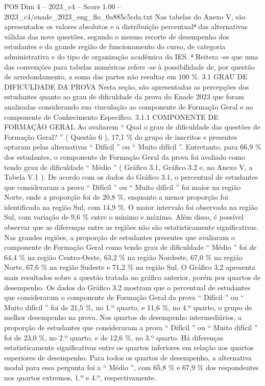 \begin{textsample}{POS Dim 4 – 2023\_c4 – Score 1.00 – 2023\_c4/enade\_2023\_eng\_flo\_0a885c5cda.txt}
Nas tabelas do Anexo V, são apresentados os valores absolutos e a distribuição percentual⁴ das alternativas válidas das nove questões, segundo o mesmo recorte de desempenho dos estudantes e da grande região de funcionamento do curso, de categoria administrativa e do tipo de organização acadêmica da IES. ⁴ Reitera -se que uma das convenções para tabelas numéricas refere -se à possibilidade de, por questão de arredondamento, a soma das partes não resultar em 100 \%. 3.1 GRAU DE DIFICULDADE DA PROVA Nesta seção, são apresentadas as percepções dos estudantes quanto ao grau de dificuldade da prova do Enade 2023 que foram analisadas considerando sua vinculação ao componente de Formação Geral e ao componente de Conhecimento Específico. 3.1.1 COMPONENTE DE FORMAÇÃO GERAL Ao avaliarem “ Qual o grau de dificuldade das questões de Formação Geral? ” ( Questão 6 ), 17,1 \% do grupo de inscritos e presentes optaram pelas alternativas “ Difícil ” ou “ Muito difícil ”.
Entretanto, para 66,9 \% dos estudantes, o componente de Formação Geral da prova foi avaliado como tendo grau de dificuldade “ Médio ” ( Gráfico 3.1, Gráfico 3.2 e, no Anexo V, a Tabela V.1 ).
De acordo com os dados do Gráfico 3.1, o percentual de estudantes que consideraram a prova “ Difícil ” ou “ Muito difícil ” foi maior na região Norte, onde a proporção foi de 20,8 \%, enquanto a menor proporção foi identificada na região Sul, com 14,9 \%.
O maior intervalo foi observado na região Sul, com variação de 9,6 \% entre o mínimo e máximo.
Além disso, é possível observar que as diferenças entre as regiões não são estatisticamente significativas.
Nas grandes regiões, a proporção de estudantes presentes que avaliaram o componente de Formação Geral como tendo grau de dificuldade “ Médio ” foi de 64,4 \% na região Centro-Oeste, 63,2 \% na região Nordeste, 67,0 \% na região Norte, 67,6 \% na região Sudeste e 71,2 \% na região Sul.
O Gráfico 3.2 apresenta mais resultados sobre a questão tratada no gráfico anterior, porém por quartos de desempenho.
Os dados do Gráfico 3.2 mostram que o percentual de estudantes que consideraram o componente de Formação Geral da prova “ Difícil ” ou “ Muito difícil ” foi de 21,5 \%, no 1.º quarto, e 11,6 \%, no 4.º quarto, o grupo de melhor desempenho na prova.
Nos quartos de desempenho intermediários, a proporção de estudantes que consideraram a prova “ Difícil ” ou “ Muito difícil ” foi de 23,0 \%, no 2.º quarto, e de 12,6 \%, no 3.º quarto.
Há diferenças estatisticamente significativas entre os quartos inferiores em relação aos quartos superiores de desempenho.
Para todos os quartos de desempenho, a alternativa modal para essa pergunta foi a “ Médio ”, com 65,8 \% e 67,9 \% dos respondentes nos quartos extremos, 1.º e 4.º, respectivamente.

\end{textsample}
